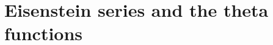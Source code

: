 \documentclass[11pt, reqno]{amsart}
\theoremstyle{plain}
\newtheorem{lemma}[theorem]{Lemma}
\theoremstyle{definition}
\numberwithin{equation}{section}
\begin{document}










\section{Eisenstein series and the  theta functions}\label{jacobitheta}
\end{document}
